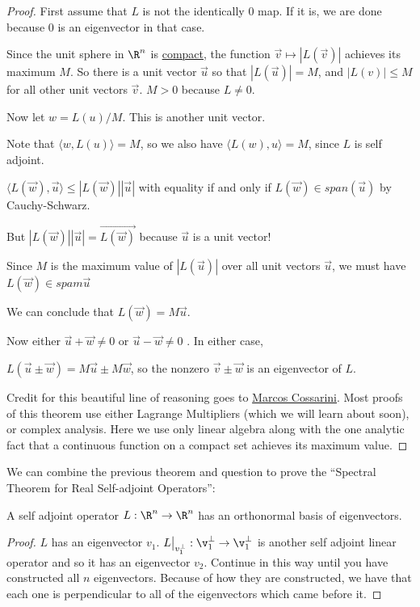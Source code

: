 \documentclass{ximera}
\begin{document}
\begin{proof}
	First assume that $L$ is not the identically $0$ map.  If it is, we are done because $0$ is an eigenvector in that case.
	
	Since the unit sphere in $\R^n$ is \href{http://en.wikipedia.org/wiki/Compact_space}{compact},
	 the function $\vec{v} \mapsto |L(\vec{v})|$ achieves its maximum $M$.  So there is a unit vector 
	$\vec{u}$ so that $|L(\vec{u})| = M$, and $|L(v)| \leq M$ for all other unit vectors $\vec{v}$.  $M > 0$ because $L \neq 0$.
	
	Now let $w = L(u)/M$.  This is another unit vector.
	
	Note that $\langle w, L(u)\rangle = M$, so we also have $\langle L(w), u \rangle = M$, since $L$ is self adjoint.
	
	$\langle L(\vec{w}),\vec{u}\rangle \leq |L(\vec{w})||\vec{u}|$ with equality if and only if $L(\vec{w}) \in span(\vec{u})$ by Cauchy-Schwarz.
	
	But $|L(\vec{w})||\vec{u}| = \vec{L(\vec{w})}$ because $\vec{u}$ is a unit vector!
		
	Since $M$ is the maximum value of $|L(\vec{u})|$ over all unit vectors $\vec{u}$, we must have  $L(\vec{w}) \in spam{\vec{u}}$
	
	We can conclude that $L(\vec{w}) = M\vec{u}$.
	
	Now either $\vec{u}+\vec{w} \neq 0$ or $\vec{u}-\vec{w} \neq 0$ .  In either case,
	
	$L(\vec{u} \pm \vec{w}) = M\vec{u} \pm M\vec{w}$, so the nonzero $\vec{v} \pm \vec{w}$ is an eigenvector of $L$.
	
	Credit for this beautiful line of reasoning goes to \href{http://mathoverflow.net/a/118759/1106}{Marcos Cossarini}.  Most proofs of this theorem use either 
	Lagrange Multipliers (which we will learn about soon), or complex analysis.  Here we use only linear algebra along with the one analytic fact that a continuous 
	function on a compact set achieves its maximum value.
\end{proof}

	We can combine the previous theorem and question to prove the ``Spectral Theorem for Real Self-adjoint Operators'':  
	
	\begin{theorem}
		A self adjoint operator $L : \R^n \to \R^n$ has an orthonormal basis of eigenvectors.
	\end{theorem}
	
\begin{proof}
	$L$ has an eigenvector $v_1$.  $L\big|_{v_1^\perp} : \v_1^\perp \to \v_1^\perp$  is another self adjoint linear operator and so it has an eigenvector $v_2$.  
	Continue in this way until you have constructed all $n$ eigenvectors.  Because of how they are constructed, we have that each one is perpendicular to all of the 
	eigenvectors which came before it. 
\end{proof}
\end{document}
